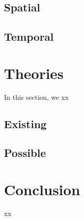 	\subsection{Spatial}
	\label{ss:spatial}
	\subsection{Temporal}
	\label{ss:temporal}
%
%
%
\section{Theories}
\label{s:theories}
	In this section, we xx
	\subsection{Existing}
	\label{ss:existing}
	\subsection{Possible}
	\label{ss:possible}
%
%
%
\section{Conclusion}
\label{s:concl}
	xx
%
%
%

